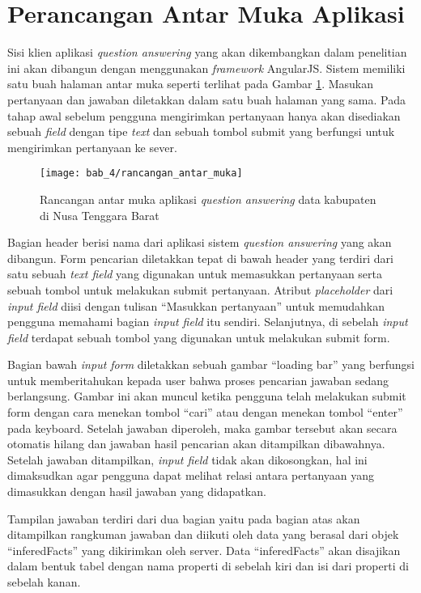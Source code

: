 \section{Perancangan Antar Muka Aplikasi}
Sisi klien aplikasi \emph{question answering} yang akan dikembangkan dalam penelitian ini akan dibangun dengan menggunakan \emph{framework} AngularJS. Sistem memiliki satu buah halaman antar muka seperti terlihat pada Gambar \ref{fig:rancangan_antarmuka}. Masukan pertanyaan dan jawaban diletakkan dalam satu buah halaman yang sama. Pada tahap awal sebelum pengguna mengirimkan pertanyaan hanya akan disediakan sebuah \emph{field} dengan tipe \emph{text} dan sebuah tombol submit yang berfungsi untuk mengirimkan pertanyaan ke sever.

\begin{figure}[ht]
    \centering
    \texttt{[image: bab\_4/rancangan\_antar\_muka]}
    \caption{Rancangan antar muka aplikasi \emph{question answering} data kabupaten di Nusa Tenggara Barat}
    \label{fig:rancangan_antarmuka}
\end{figure}

Bagian header berisi nama dari aplikasi sistem \emph{question answering} yang akan dibangun. Form pencarian diletakkan tepat di bawah header yang terdiri dari satu sebuah \emph{text field} yang digunakan untuk memasukkan pertanyaan serta sebuah tombol untuk melakukan submit pertanyaan. Atribut \emph{placeholder} dari \emph{input field} diisi dengan tulisan ``Masukkan pertanyaan'' untuk memudahkan pengguna memahami bagian \emph{input field} itu sendiri. Selanjutnya, di sebelah \emph{input field} terdapat sebuah tombol yang digunakan untuk melakukan submit form.

Bagian bawah \emph{input form} diletakkan sebuah gambar ``loading bar'' yang berfungsi untuk memberitahukan kepada user bahwa proses pencarian jawaban sedang berlangsung. Gambar ini akan muncul ketika pengguna telah melakukan submit form dengan cara menekan tombol ``cari'' atau dengan menekan tombol ``enter'' pada keyboard. Setelah jawaban diperoleh, maka gambar tersebut akan secara otomatis hilang dan jawaban hasil pencarian akan ditampilkan dibawahnya. Setelah jawaban ditampilkan, \emph{input field} tidak akan dikosongkan, hal ini dimaksudkan agar pengguna dapat melihat relasi antara pertanyaan yang dimasukkan dengan hasil jawaban yang didapatkan.

Tampilan jawaban terdiri dari dua bagian yaitu pada bagian atas akan ditampilkan rangkuman jawaban dan diikuti oleh data yang berasal dari objek ``inferedFacts'' yang dikirimkan oleh server. Data ``inferedFacts'' akan disajikan dalam bentuk tabel dengan nama properti di sebelah kiri dan isi dari properti di sebelah kanan.
